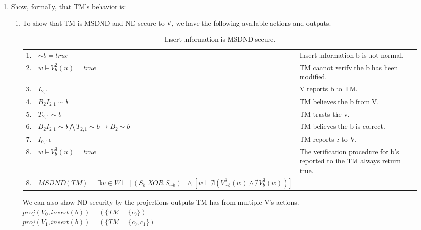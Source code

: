 \documentclass[journal,onecolumn]{IEEEtran}
\begin{document}
\begin{enumerate}
\begin{enumerate}
      \item Show, formally, that TM's behavior is:
      
      \begin{enumerate}
        \item To show that TM is MSDND and ND secure to V, we have the following available actions and outputs.
        
        \begin{table}[H]
          \caption{Insert information is MSDND secure.}
          \centering
          \begin{tabular}{lll}
          1.  & ${\sim} b = true$          & Insert information b is not normal.                                                       \\
          2.  & $w \vDash V^2_b(w) = true$ & TM cannot verify the b has been modified.                                 \\
          3.  & $I_{2,1}$                 & V reports b to TM.                                                \\
          4.  & $B_2I_{2,1} {\sim} b$      & TM believes the b from V.                                     \\
          5.  & $T_{2,1} {\sim} b$         & TM trusts the v.                                                          \\
          6.  & $B_2I_{2,1} {\sim} b \bigwedge T_{2,1} {\sim} b \rightarrow B_2 {\sim} b$ & TM believes the b is correct.                                             \\
          7.  & $I_{0,1}c$                 & TM reports c to V.           \\
          8.  & $w \vDash V^3_b(w) = true$  & The verification procedure for b's reported to the TM always return true. \\
          8.  & $MSDND (TM) = \exists w \in W \vdash [(S_{b} \; {XOR} \; S_{\sim b})] \wedge [w \vdash \nexists (V_{\sim b}^3 (w) \wedge \nexists V_{b}^3 (w))]$ & 
          \end{tabular}
        \end{table}

        We can also show ND security by the projections outputs TM has from multiple V's actions.\\

        $proj(V_0, insert(b)) = (\{TM = \{c_0\})$ \\
        $proj(V_1, insert(b)) = (\{TM = \{c_0, c_1\})$ \\
        


\end{enumerate}
\end{enumerate}
\end{enumerate}
\end{document}
